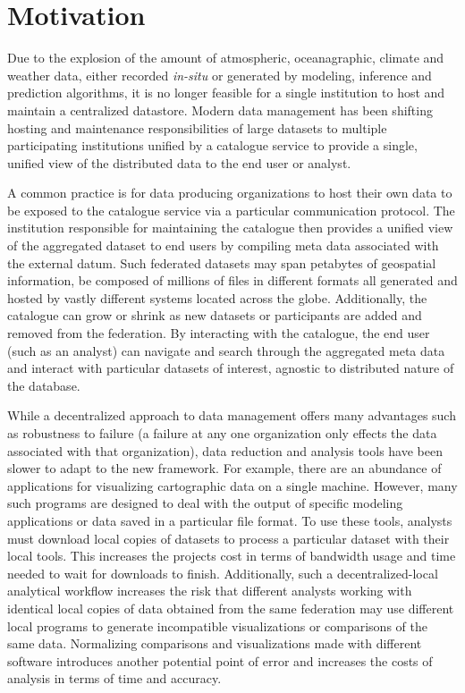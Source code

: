 \section{Motivation}
\label{sec:motivation}
Due to the explosion of the amount of atmospheric, oceanagraphic,
climate and weather data, either recorded \emph{in-situ} or generated
by modeling, inference and prediction algorithms, it is no longer
feasible for a single institution to host and maintain a centralized
datastore. Modern data management has been shifting hosting and
maintenance responsibilities of large datasets to multiple
participating institutions unified by a catalogue service to provide a
single, unified view of the distributed data to the end user or
analyst.

A common practice is for data producing organizations to host their
own data to be exposed to the catalogue service via a particular
communication protocol. The institution responsible for maintaining
the catalogue then provides a unified view of the aggregated dataset
to end users by compiling meta data associated with the external
datum. Such federated datasets may span petabytes of geospatial
information, be composed of millions of files in different formats all
generated and hosted by vastly different systems located across the
globe. Additionally, the catalogue can grow or shrink as new datasets
or participants are added and removed from the federation. By
interacting with the catalogue, the end user (such as an analyst) can
navigate and search through the aggregated meta data and interact with
particular datasets of interest, agnostic to distributed nature of the
database.

While a decentralized approach to data management offers many
advantages such as robustness to failure (a failure at any one
organization only effects the data associated with that organization),
data reduction and analysis tools have been slower to adapt to the new
framework. For example, there are an abundance of applications for
visualizing cartographic data on a single machine. However, many such
programs are designed to deal with the output of specific modeling
applications or data saved in a particular file format. To use these
tools, analysts must download local copies of datasets to process a
particular dataset with their local tools. This increases the projects
cost in terms of bandwidth usage and time needed to wait for downloads
to finish. Additionally, such a decentralized-local analytical
workflow increases the risk that different analysts working with
identical local copies of data obtained from the same federation may
use different local programs to generate incompatible visualizations
or comparisons of the same data. Normalizing comparisons and
visualizations made with different software introduces another
potential point of error and increases the costs of analysis in terms
of time and accuracy.


